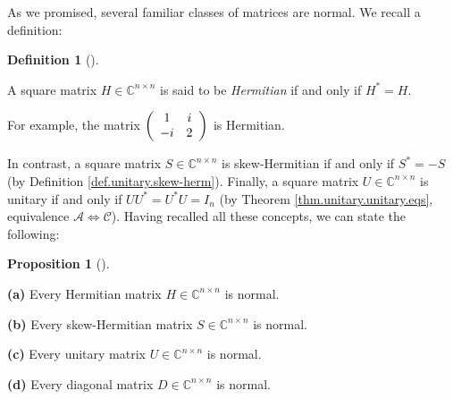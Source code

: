 \documentclass[numbers=enddot,12pt,final,onecolumn,notitlepage]{scrartcl}%
\numberwithin{exer}{subsection}
\theoremstyle{definition}
\newtheorem{prop}[theo]{Proposition}
\newenvironment{proposition}[1][]
{\begin{prop}[#1]\begin{leftbar}}
{\end{leftbar}\end{prop}}
\newtheorem{defi}[theo]{Definition}
\newenvironment{definition}[1][]
{\begin{defi}[#1]\begin{leftbar}}
{\end{leftbar}\end{defi}}
\begin{document}
As we promised, several familiar classes of matrices are normal. We recall a definition:

\begin{definition}
\label{def.schurtri.herm}A square matrix $H\in\mathbb{C}^{n\times n}$ is said
to be \emph{Hermitian} if and only if $H^{\ast}=H$.
\end{definition}

For example, the matrix $\left(
\begin{array}
[c]{cc}%
1 & i\\
-i & 2
\end{array}
\right)  $ is Hermitian.

In contrast, a square matrix $S\in\mathbb{C}^{n\times n}$ is skew-Hermitian if
and only if $S^{\ast}=-S$ (by Definition \ref{def.unitary.skew-herm}).
Finally, a square matrix $U\in\mathbb{C}^{n\times n}$ is unitary if and only
if $UU^{\ast}=U^{\ast}U=I_{n}$ (by Theorem \ref{thm.unitary.unitary.eqs},
equivalence $\mathcal{A}\Longleftrightarrow\mathcal{C}$). Having recalled all
these concepts, we can state the following:

\begin{proposition}
\label{prop.schurtri.normal.classes}\textbf{(a)} Every Hermitian matrix
$H\in\mathbb{C}^{n\times n}$ is normal. \medskip

\textbf{(b)} Every skew-Hermitian matrix $S\in\mathbb{C}^{n\times n}$ is
normal. \medskip

\textbf{(c)} Every unitary matrix $U\in\mathbb{C}^{n\times n}$ is normal.
\medskip

\textbf{(d)} Every diagonal matrix $D\in\mathbb{C}^{n\times n}$ is normal.
\end{proposition}
\end{document}
